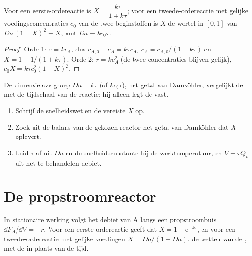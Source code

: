 \begin{theorem}\label{thm:b2:continuous-reactors:cstr}
Voor een eerste-ordereactie is $X = \dfrac{k\tau}{1 + k\tau}$; voor een
tweede-ordereactie met gelijke voedingsconcentraties $c_0$ van de twee
beginstoffen is $X$ de wortel in $[0, 1]$ van $Da\,(1 - X)^2 = X$, met $Da =
kc_0\tau$.
\end{theorem}

\begin{proof}
Orde 1: $r = kc_A$, dus $c_{A,0} - c_A = k\tau c_A$, $c_A = c_{A,0}/(1 + k\tau)$
en $X = 1 - 1/(1 + k\tau)$. Orde 2: $r = kc_A^2$ (de twee concentraties blijven
gelijk), $c_0X = k\tau c_0^2(1 - X)^2$.
\end{proof}

De dimensieloze groep $Da = k\tau$ (of $kc_0\tau$), het getal van
Damköhler, vergelijkt de  met de tijdschaal van de reactie:
hij alleen legt de  vast.

\begin{method}\label{met:b2:continuous-reactors:size-reactor}
\begin{enumerate}
  \item Schrijf de snelheidswet en de vereiste  $X$ op.
  \item Zoek uit de balans van de gekozen reactor het getal van Damköhler
        dat $X$ oplevert.
  \item Leid $\tau$ af uit $Da$ en de snelheidsconstante bij de werktemperatuur,
        en $V = \tau Q_v$ uit het te behandelen debiet.
\end{enumerate}
\end{method}

\section{De propstroomreactor}

\begin{theorem}\label{thm:b2:continuous-reactors:pfr}
In stationaire werking volgt het debiet van A langs een propstroombuis
$\dd F_A/\dd V = -r$. Voor een eerste-ordereactie geeft dat $X = 1 -
\mathrm e^{-k\tau}$, en voor een tweede-ordereactie met gelijke voedingen $X =
Da/(1 + Da)$: de wetten van de , met de  in
plaats van de tijd.
\end{theorem}

